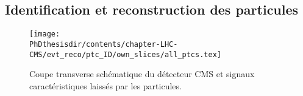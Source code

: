 \subsection{Identification et reconstruction des particules}\label{chapter-LHC-section-evt_reco-subsec-ptc_ID}
\begin{figure}
\texttt{[image: \\PhDthesisdir/contents/chapter-LHC-CMS/evt\_reco/ptc\_ID/own\_slices/all\_ptcs.tex]}
\caption{Coupe transverse schématique du détecteur CMS et signaux caractéristiques laissés par les particules.}
\label{fig-chapter-LHC-section-evt_reco-subsec-ptc_ID-cms_slice}
\end{figure}